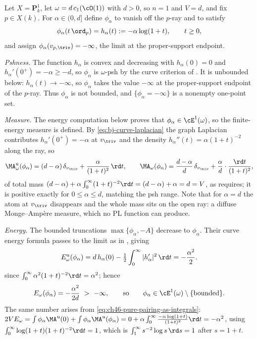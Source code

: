 \begin{example}
\label{ex:ch47-p1-unbounded}
Let $X=\mathbf P^1_k$, let $\omega=d\,c_1(\cO(1))$ with $d>0$, so
$n=1$ and $V=d$, and fix $p\in X(k)$.  For $\alpha\in(0,d]$ define
$\phi_\alpha$ to vanish off the $p$-ray and to satisfy
\[
 \phi_\alpha(t\,\ord_p)=h_\alpha(t):=-\alpha\log(1+t),
 \qquad t\ge0,
\]
and assign $\phi_\alpha(v_{p,\triv})=-\infty$, the limit at the
proper-support endpoint.

\emph{Pshness.}  The function $h_\alpha$ is convex and decreasing with
$h_\alpha(0)=0$ and $h_\alpha'(0^+)=-\alpha\ge-d$, so $\phi_\alpha$
is $\omega$-psh by the curve criterion of .  It
is unbounded below: $h_\alpha(t)\to-\infty$, so $\phi_\alpha$ takes the
value $-\infty$ at the proper-support endpoint of the $p$-ray.  Thus
$\phi_\alpha$ is not bounded, and $\{\phi_\alpha=-\infty\}$ is a
nonempty one-point set.

\emph{Measure.} The energy computation below proves that
$\phi_\alpha\in\cE^1(\omega)$, so the finite-energy measure is defined.
By \eqref{eq:bj-curve-laplacian} the graph Laplacian
contributes $h_\alpha'(0^+)=-\alpha$ at $v_{\triv}$ and the density
$h_\alpha''(t)=\alpha(1+t)^{-2}$ along the ray, so
\[
 \MA^{\mathrm u}_\omega(\phi_\alpha)
 =(d-\alpha)\,\delta_{v_{\triv}}+\frac{\alpha}{(1+t)^2}\,\rd t,
 \qquad
 \MA_\omega(\phi_\alpha)
 =\frac{d-\alpha}{d}\,\delta_{v_{\triv}}
 +\frac{\alpha}{d}\cdot\frac{\rd t}{(1+t)^2},
\]
of total mass $(d-\alpha)+\alpha\int_0^\infty(1+t)^{-2}\rd t
=(d-\alpha)+\alpha=d=V$, as  requires; it is
positive exactly for $0\le\alpha\le d$, matching the psh range.  Note
that for $\alpha=d$ the atom at $v_{\triv}$ disappears and the whole
mass sits on the open ray: a diffuse Monge--Amp\`ere measure, which no PL
function can produce.

\emph{Energy.} The bounded truncations
$\max\{\phi_\alpha,-A\}$ decrease to $\phi_\alpha$. Their curve energy
formula passes to the limit as in , giving
\[
 E^{\mathrm u}_\omega(\phi_\alpha)
 =d\,h_\alpha(0)-\tfrac12\int_0^\infty|h_\alpha'|^2\,\rd t
 =-\frac{\alpha^2}{2}.
\]
since $\int_0^\infty\alpha^2(1+t)^{-2}\rd t=\alpha^2$; hence
\[
 E_\omega(\phi_\alpha)=-\frac{\alpha^2}{2d}\ >\ -\infty,
 \qquad\text{so}\qquad
 \phi_\alpha\in\cE^1(\omega)\setminus\{\text{bounded}\}.
\]
The same number arises from
\eqref{eq:ch46-pure-pairing-as-integrals}:
$2V E_\omega=\int\phi_\alpha\MA^{\mathrm u}(0)
+\int\phi_\alpha\MA^{\mathrm u}(\phi_\alpha)
=0+\alpha\int_0^\infty\frac{-\alpha\log(1+t)}{(1+t)^2}\rd t=-\alpha^2$,
using $\int_0^\infty\log(1+t)(1+t)^{-2}\rd t=1$, which is
$\int_1^\infty s^{-2}\log s\,\rd s=1$ after $s=1+t$.


\end{example}
